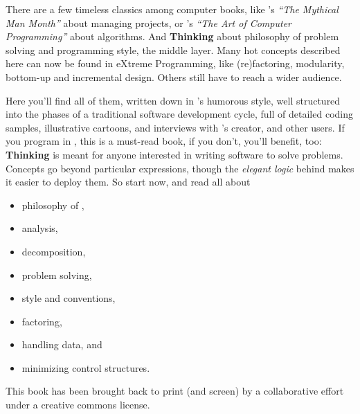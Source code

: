 
\noindent
There are a few timeless classics among computer books, like 's \emph{``The Mythical Man Month''} about managing projects, or
's \emph{``The Art of Computer Programming''} about
algorithms. And \textbf{Thinking \Forth} about philosophy of problem
solving and programming style, the middle layer. Many hot concepts
described here can now be found in eXtreme Programming, like
(re)factoring, modularity, bottom-up and incremental design. Others
still have to reach a wider audience.

Here you'll find all of them, written down in 's
humorous style, well structured into the phases of a traditional
software development cycle, full of detailed coding samples,
illustrative cartoons, and interviews with \Forth's creator,
 and other
\Forth{} users. If you program in \Forth{}, this is a must-read book,
if you don't, you'll benefit, too: \textbf{Thinking \Forth{}} is meant
for anyone interested in writing software to solve problems.  Concepts
go beyond particular expressions, though the \emph{elegant logic}
behind \Forth{} makes it easier to deploy them. So start now, and read
all about
\begin{itemize}
\item philosophy of \Forth{},
\item analysis,
\item decomposition,
\item problem solving,
\item style and conventions,
\item factoring,
\item handling data, and
\item minimizing control structures.
\end{itemize}

This book has been brought back to print (and screen) by a
collaborative effort under a creative commons license.

